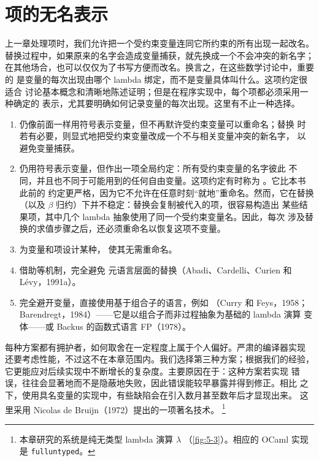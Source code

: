 
\chapter{项的无名表示}
\label{chap:6}

上一章处理项时，我们允许把一个受约束变量连同它所约束的所有出现一起改名。
替换过程中，如果原来的名字会造成变量捕获，就先换成一个不会冲突的新名字；
在其他场合，也可以仅仅为了书写方便而改名。换言之，在这些数学讨论中，重要的
是变量的每次出现由哪个 lambda 绑定，而不是变量具体叫什么。这项约定很适合
讨论基本概念和清晰地陈述证明；但是在程序实现中，每个项都必须采用一种确定的
表示，尤其要明确如何记录变量的每次出现。这里有不止一种选择。

\begin{enumerate}
  \item 仍像前面一样用符号表示变量，但不再默许受约束变量可以重命名；替换
    时若有必要，则显式地把受约束变量改成一个不与相关变量冲突的新名字，
    以避免变量捕获。

  \item 仍用符号表示变量，但作出一项全局约定：所有受约束变量的名字彼此
    不同，并且也不同于可能用到的任何自由变量。这项约定有时称为
    。它比本书此前的
    约定更严格，因为它不允许在任意时刻“就地”重命名。然而，它在替换
    （以及 \(\beta\) 归约）下并不稳定：替换会复制被代入的项，很容易构造出
    某些结果项，其中几个 lambda 抽象使用了同一个受约束变量名。因此，每次
    涉及替换的求值步骤之后，还必须重命名以恢复这项不变量。

  \item 为变量和项设计某种，
    使其无需重命名。

  \item 借助等机制，完全避免
    元语言层面的替换（Abadi、Cardelli、Curien 和 Lévy，1991a）。

  \item 完全避开变量，直接使用基于组合子的语言，例如
    （Curry 和 Feys，1958；
    Barendregt，1984）——它是以组合子而非过程抽象为基础的 lambda 演算
    变体——或 Backus 的函数式语言 FP（1978）。
\end{enumerate}

每种方案都有拥护者，如何取舍在一定程度上属于个人偏好。严肃的编译器实现
还要考虑性能，不过这不在本章范围内。我们选择第三种方案；根据我们的经验，
它更能应对后续实现中不断增长的复杂度。主要原因在于：这种方案若实现
错误，往往会显著地而不是隐蔽地失败，因此错误能较早暴露并得到修正。相比
之下，使用具名变量的实现中，有些缺陷会在引入数月甚至数年后才显现出来。
这里采用 Nicolas de Bruijn（1972）提出的一项著名技术。
\footnote{本章研究的系统是纯无类型 lambda 演算 \(\lambda\)
（\cref{fig:5-3}）。相应的 OCaml 实现是 \texttt{fulluntyped}。}

